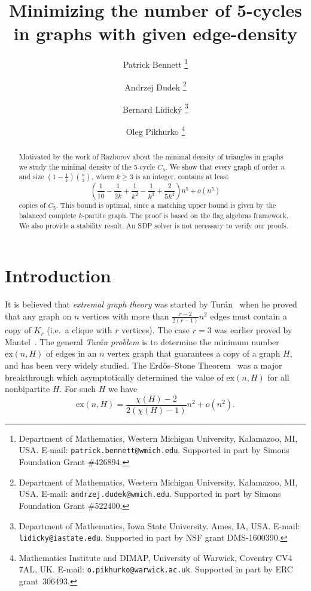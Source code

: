 \documentclass[12pt]{article}
\newcommand{\ex}{\mathrm{ex}}
\theoremstyle{definition}
\theoremstyle{remark}
\renewcommand{\ge}{\geqslant}
\begin{document}
\title{Minimizing the number of 5-cycles in graphs with given edge-density}
\author{
Patrick Bennett \thanks{Department of Mathematics, Western Michigan University, Kalamazoo, MI, USA. E-mail: {\tt patrick.bennett@wmich.edu}. Supported in part by Simons Foundation Grant \#426894.}
\and
Andrzej Dudek \thanks{Department of Mathematics, Western Michigan University, Kalamazoo, MI, USA. E-mail: {\tt andrzej.dudek@wmich.edu}. Supported in part by Simons Foundation Grant \#522400.}
\and
Bernard Lidick\'{y} \thanks{Department of Mathematics, Iowa State University. Ames, IA, USA. E-mail: {\tt lidicky@iastate.edu}. Supported in part by NSF grant DMS-1600390.}
\and
Oleg Pikhurko  \thanks{Mathematics Institute and DIMAP,
University of Warwick, Coventry CV4 7AL, UK. E-mail: {\tt o.pikhurko@warwick.ac.uk}. Supported in part by ERC
grant~306493.}
}

\maketitle

\begin{abstract}
Motivated by the work of Razborov about the minimal density of triangles in graphs we study the minimal density of the 5-cycle $C_5$. We show that every graph of order $n$ and size $\left( 1-\frac{1}{k}\right)\binom{n}{2}$, where $k\ge 3$ is an integer, contains at least
\[
\left( \frac{1}{10} -\frac{1}{2k} + \frac{1}{k^2} - \frac{1}{k^3} + \frac{2}{5 k^4} \right)n^5 +o(n^5)
\]
copies of $C_5$. This bound is optimal, since a matching upper bound is given by the balanced complete $k$-partite graph. The proof is based on the flag algebras framework. We also provide a stability result. An SDP solver is not necessary to verify our proofs.
\end{abstract}


\section{Introduction}
It is believed that \emph{extremal graph theory} was started by Tur\'an~\cite{Tur1941} when he proved that any graph on $n$ vertices with more than $\frac{r-2}{2(r-1)}n^2$ edges must contain a copy of $K_r$ (i.e.\ a clique with $r$ vertices). The case $r=3$ was earlier proved by Mantel~\cite{Man1907}.
The general \emph{Tur\'an problem} is to determine the minimum number $\ex(n, H)$ of edges in an $n$ vertex graph that guarantees a copy of a graph $H$, and has been very widely studied. The Erd\H{o}s--Stone Theorem~\cite{ErdSto1946} was a major breakthrough which asymptotically determined the value of $\ex(n, H)$ for all nonbipartite $H$. For such $H$ we have 
\[
\ex(n, H) = \frac{\chi(H)-2}{2(\chi(H)-1)}n^2 + o(n^2).
\]
\end{document}

